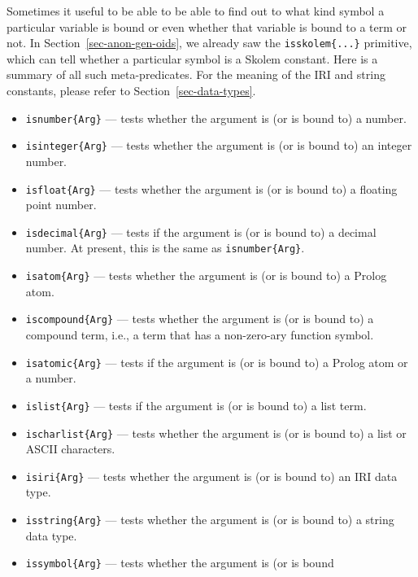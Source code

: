 \documentclass[11pt]{article}
\begin{document}
Sometimes it useful to be able to be able to find out to what kind symbol a
particular variable is bound or even whether that variable
is bound to a term or not.
In Section~\ref{sec-anon-gen-oids}, we already saw the
\texttt{isskolem\{...\}} primitive, which can tell whether a particular
symbol is a Skolem constant. Here is a summary of all such meta-predicates.
For the meaning of the IRI and string constants, please refer to
Section~\ref{sec-data-types}.
\begin{itemize}
\item \texttt{isnumber\{Arg\}} --- tests whether the argument is (or is bound
  to) a number.
\item \texttt{isinteger\{Arg\}} --- tests whether the argument is (or is bound
  to) an integer number. 
\item \texttt{isfloat\{Arg\}} --- tests whether the argument is (or is bound
  to) a floating point number.
\item \texttt{isdecimal\{Arg\}} --- tests if the argument is (or is bound
  to) a decimal number. At present, this is the same as
  \texttt{isnumber\{Arg\}}.
\item \texttt{isatom\{Arg\}} --- tests whether the argument is (or is bound
  to) a Prolog atom.
\item \texttt{iscompound\{Arg\}} --- tests whether the argument is (or is bound
  to) a compound term, i.e., a term that has a non-zero-ary function
  symbol.
\item \texttt{isatomic\{Arg\}} --- tests if the argument is (or is bound
  to) a Prolog atom or a number.
\item \texttt{islist\{Arg\}} --- tests if the argument is (or is bound
  to) a list term.
\item \texttt{ischarlist\{Arg\}} --- tests whether the argument is (or is bound
  to) a list or ASCII characters.
\item \texttt{isiri\{Arg\}} --- tests whether the argument is (or is bound
  to) an IRI data type.
\item \texttt{isstring\{Arg\}} --- tests whether the argument is (or is bound
  to) a string data type.
\item \texttt{issymbol\{Arg\}} --- tests whether the argument is (or is bound

\end{itemize}
\end{document}
